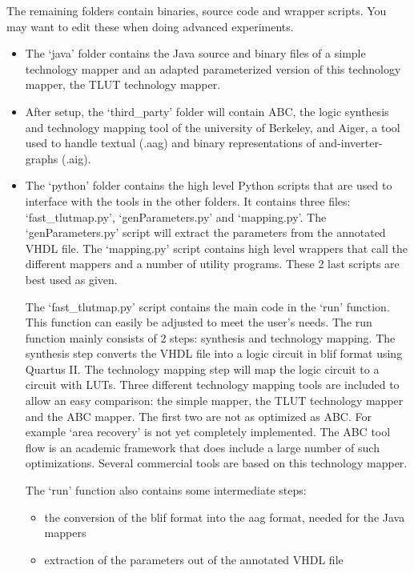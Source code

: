 \documentclass[a4paper,oneside]{memoir}
\begin{document}
The remaining folders contain binaries, source code and wrapper scripts. You may want to edit these when doing advanced experiments.
\begin{itemize}
\item The `java' folder contains the Java source and binary files of a simple technology mapper and an adapted parameterized version of this technology mapper, the TLUT technology mapper.
\item After setup, the `third\_party' folder will contain ABC, the logic synthesis and technology mapping tool of the university of Berkeley, and Aiger, a tool used to handle textual (.aag) and binary representations of and-inverter-graphs (.aig).    

\item The `python' folder contains the high level Python scripts that are used to interface with the tools in the other folders. It contains three files: `fast\_tlutmap.py', `genParameters.py' and `mapping.py'. The `genParameters.py' script will extract the parameters from the annotated VHDL file. The `mapping.py' script contains high level wrappers that call the different mappers and a number of utility programs. These 2 last scripts are best used as given. 

The `fast\_tlutmap.py' script contains the main code in the `run' function. This function can easily be adjusted to meet the user's needs. The run function mainly consists of 2 steps: synthesis and technology mapping. The synthesis step converts the VHDL file into a logic circuit in blif format using Quartus II. The technology mapping step will map the logic circuit to a circuit with LUTs. Three different technology mapping tools are included to allow an easy comparison: the simple mapper, the TLUT technology mapper and the ABC mapper. The first two are not as optimized as ABC. For example `area recovery' is not yet completely implemented. The ABC tool flow is an academic framework that does include a large number of such optimizations. Several commercial tools are based on this technology mapper.

The `run' function also contains some intermediate steps:
\begin{itemize} 
\item the conversion of the blif format into the aag format, needed for the Java mappers
\item extraction of the parameters out of the annotated VHDL file
\end{itemize}

\end{itemize}

\end{document}
